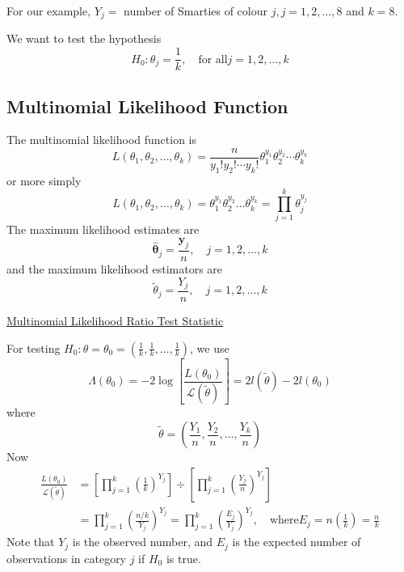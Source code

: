 For our example, $Y_{j}=$ number of Smarties of colour $j, j=1,2, \ldots, 8$ and $k=8$.

We want to test the hypothesis
\[ H_{0}: \theta_{j}=\frac{1}{k}, \quad \text{for all} j=1,2, \ldots, k \]

\subsection{Multinomial Likelihood Function}
The multinomial likelihood function is
\[
    L\left(\theta_{1}, \theta_{2}, \ldots, \theta_{k}\right)=\frac{n}{y_{1} ! y_{2} ! \cdots y_{k} !} \theta_{1}^{y_{1}} \theta_{2}^{y_{2}} \cdots \theta_{k}^{y_{k}}
\]
or more simply
\[
    L\left(\theta_{1}, \theta_{2}, \ldots, \theta_{k}\right)=\theta_{1}^{y_{1}} \theta_{2}^{y_{2}} \ldots \theta_{k}^{y_{k}}=\prod_{j=1}^{k} \theta_{j}^{y_{j}}
\]
The maximum likelihood estimates are
\[
    \hat{\symbf{\theta}}_{j}=\frac{\symbf{y}_{j}}{n}, \quad j=1,2, \ldots, k
\]
and the maximum likelihood estimators are
\[
    \tilde{\theta}_{j}=\frac{Y_{j}}{n}, \quad j=1,2, \ldots, k
\]

\underline{Multinomial Likelihood Ratio Test Statistic}

For testing $H_{0}: \theta=\theta_{0}=\left(\frac{1}{k}, \frac{1}{k}, \ldots, \frac{1}{k}\right)$, we use
\[
    \Lambda\left(\theta_{0}\right)=-2 \log \left[\frac{L\left(\theta_{0}\right)}{\mathcal{L}(\tilde{\theta})}\right]=2 l(\tilde{\theta})-2 l\left(\theta_{0}\right)
\]
where
\[
    \tilde{\theta}=\left(\frac{Y_{1}}{n}, \frac{Y_{2}}{n}, \ldots, \frac{Y_{k}}{n}\right)
\]
Now
\[
    \begin{aligned}
        \frac{L\left(\theta_{0}\right)}{\mathcal{L}(\tilde{\theta})} & =\left[\prod_{j=1}^{k}\left(\frac{1}{k}\right)^{Y_{j}}\right] \div\left[\prod_{j=1}^{k}\left(\frac{Y_{j}}{n}\right)^{Y_{j}}\right]                                               \\
                                                           & =\prod_{j=1}^{k}\left(\frac{n / k}{Y_{j}}\right)^{Y_{j}}=\prod_{j=1}^{k}\left(\frac{E_{j}}{Y_{j}}\right)^{Y_{j}}, \quad \text{where} E_{j}=n\left(\frac{1}{k}\right)=\frac{n}{k}
    \end{aligned}
\]
Note that $Y_{j}$ is the observed number, and $E_{j}$ is the expected number of observations in category $j$ if $H_{0}$ is true.

